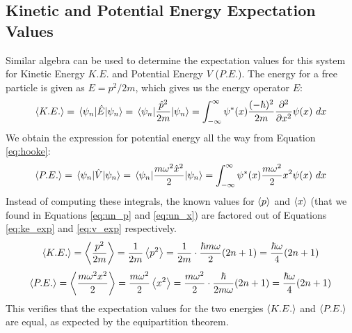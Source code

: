 \documentclass[a4paper]{article}
\begin{document}
\subsection{Kinetic and Potential Energy Expectation Values}
Similar algebra can be used to determine the expectation values for this system for Kinetic Energy $K.E.$ and Potential Energy $V$ ($P.E.$). The energy for a free particle is given as $E=p^2/2m$, which gives us the energy operator $E$:
\begin{equation} \label{eq:ke_exp}
\expval{K.E.} = \mel{\psi_n}{\hat E}{\psi_n} = \mel{\psi_n}{\frac{\hat p^2}{2m}}{\psi_n} = \int^\infty_{-\infty}\psi^*(x)\frac{(-\hbar)^2}{2m}\frac{\partial^2}{\partial x^2}\psi(x)\ dx
\end{equation}
We obtain the expression for potential energy all the way from Equation \ref{eq:hooke}:
\begin{equation} \label{eq:v_exp}
\expval{P.E.}=\mel{\psi_n}{\hat V}{\psi_n}=\mel{\psi_n}{\frac{m\omega^2\hat x^2}2}{\psi_n}=\int^\infty_{-\infty}\psi^*(x)\frac{m\omega^2}2x^2\psi(x)\ dx
\end{equation}
Instead of computing these integrals, the known values for $\expval p$ and $\expval x$ (that we found in Equations \ref{eq:un_p} and \ref{eq:un_x}) are factored out of Equations \ref{eq:ke_exp} and \ref{eq:v_exp} respectively.
\begin{equation} \label{eq:ke_exp}
\expval{K.E.}=\expval{\frac{p^2}{2m}}=\frac1{2m}\expval{p^2}=\frac1{2m}\cdot\frac{\hbar m\omega}2(2n+1)=\frac{\hbar \omega}4(2n+1)
\end{equation}
\begin{equation} \label{eq:pe_exp}
\expval{P.E.}=\expval{\frac{m\omega^2x^2}2}=\frac{m\omega^2}2\expval{x^2}=\frac{m\omega^2}2\cdot\frac\hbar{2m\omega}(2n+1)=\frac{\hbar \omega}4(2n+1)
\end{equation}
This verifies that the expectation values for the two energies $\expval{K.E.}$ and $\expval{P.E.}$ are equal, as expected by the equipartition theorem.
\end{document}
